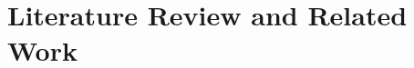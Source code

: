 


\def\baselinestretch{1}

\chapter{Literature Review and Related Work}

\def\baselinestretch{1.66}




\smallskip

\goodbreak
